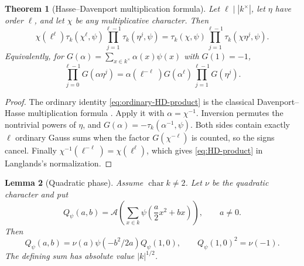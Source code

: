 \documentclass[11pt]{amsart}
\newtheorem{theorem}{Theorem}[section]
\newtheorem{lemma}[theorem]{Lemma}
\theoremstyle{definition}
\theoremstyle{remark}
\newcommand{\Aphase}{\mathcal A}
\begin{document}
\begin{theorem}[Hasse--Davenport multiplication formula]
\label{thm:HD-product}
Let $\ell\mid |k^\times|$, let $\eta$ have order $\ell$, and let
$\chi$ be any multiplicative character.  Then
\begin{equation}\label{eq:HD-product}
 \chi(\ell^\ell)\tau_k(\chi^\ell,\psi)
 \prod_{j=1}^{\ell-1}\tau_k(\eta^j,\psi)
 =\tau_k(\chi,\psi)
 \prod_{j=1}^{\ell-1}\tau_k(\chi\eta^j,\psi).
\end{equation}
Equivalently, for
$G(\alpha)=\sum_{x\in k^\times}\alpha(x)\psi(x)$ with $G(1)=-1$,
\begin{equation}\label{eq:ordinary-HD-product}
 \prod_{j=0}^{\ell-1}G(\alpha\eta^j)
 =\alpha(\ell^{-\ell})G(\alpha^\ell)
   \prod_{j=1}^{\ell-1}G(\eta^j).
\end{equation}
\end{theorem}

\begin{proof}
The ordinary identity \eqref{eq:ordinary-HD-product} is the classical
Davenport--Hasse multiplication formula \cite{DavenportHasse}.  Apply
it with
$\alpha=\chi^{-1}$.  Inversion permutes the nontrivial powers of
$\eta$, and $G(\alpha)=-\tau_k(\alpha^{-1},\psi)$.  Both sides contain
exactly $\ell$ ordinary Gauss sums when the factor
$G(\chi^{-\ell})$ is counted, so the signs cancel.  Finally
$\chi^{-1}(\ell^{-\ell})=\chi(\ell^\ell)$, which gives
\eqref{eq:HD-product} in Langlands's normalization.
\end{proof}

\begin{lemma}[Quadratic phase]\label{lem:quadratic-phase-new}
Assume $\operatorname{char}k\neq2$.  Let $\nu$ be the quadratic
character and put
\[
 Q_\psi(a,b)=\Aphase\!\left(\sum_{x\in k}
     \psi\left(\frac a2x^2+bx\right)\right),\qquad a\neq0.
\]
Then
\begin{equation}\label{eq:quadratic-phase-new}
 Q_\psi(a,b)=\nu(a)\psi(-b^2/2a)Q_\psi(1,0),
 \qquad Q_\psi(1,0)^2=\nu(-1).
\end{equation}
The defining sum has absolute value $|k|^{1/2}$.
\end{lemma}
\end{document}
